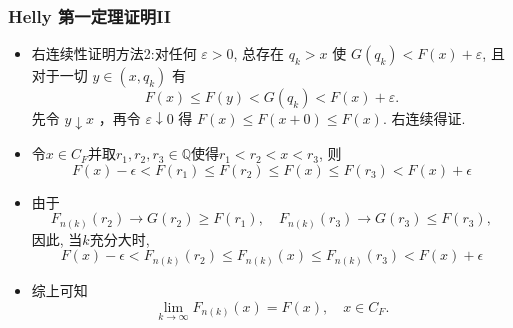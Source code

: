 \begin{frame}
	\frametitle{{\rm Helly} 第一定理证明II}


\begin{itemize}[<+-|alert@+>]

\item 右连续性证明方法2:对任何 $\varepsilon>0$, 总存在 $q_{k}>x$ 使 $G\left(q_{k}\right)<F(x)+\varepsilon$, 且对于一切 $y \in\left(x, q_{k}\right)$ 有
\[
F(x)\leq F(y)<G\left(q_{k}\right)<F(x)+\varepsilon .
\]
先令 $y \downarrow x$ ，再令 $\varepsilon \downarrow 0$ 得 $F(x)\leq F(x+0) \leq F(x)$. 右连续得证.
\item 令$x\in C_F$并取$r_1,r_2,r_3\in\mathbb{Q}$使得$r_{1}<r_{2}<x<r_3$, 则
	\[
	F(x)-\epsilon<F\left(r_{1}\right) \leq F\left(r_{2}\right) \leq F(x) \leq F(r_3)<F(x)+\epsilon
	\]
\item 由于
 \[ F_{n(k)}\left(r_{2}\right) \rightarrow G\left(r_{2}\right) \geq F\left(r_{1}\right), \quad  F_{n(k)}(r_3) \rightarrow G(r_3) \leq F(r_3), \]
 \pause 因此, 当$k$充分大时,
	\[
	F(x)-\epsilon<F_{n(k)}\left(r_{2}\right) \leq F_{n(k)}(x) \leq F_{n(k)}(r_3)<F(x)+\epsilon
	\]
	\item 综上可知
	\[\lim_{k \rightarrow \infty}F_{n(k)}(x) = F(x), \quad x\in C_F.\]
\end{itemize}
\end{frame}
